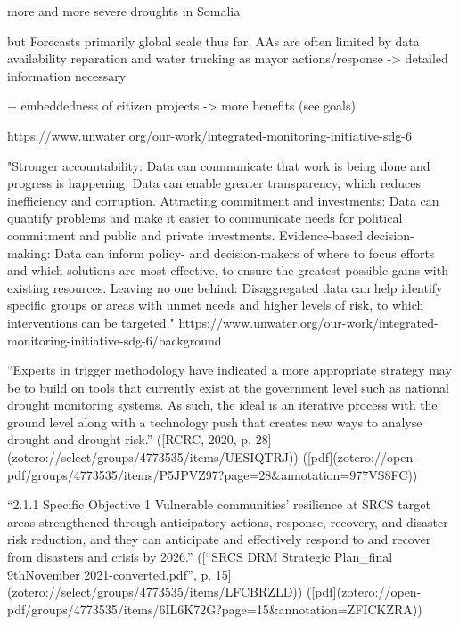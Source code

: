more and more severe droughts in Somalia

but Forecasts primarily global scale
thus far, AAs are often limited by data availability
reparation and water trucking as mayor actions/response -> detailed information necessary

+ embeddedness of citizen projects -> more benefits (see goals)



https://www.unwater.org/our-work/integrated-monitoring-initiative-sdg-6

"Stronger accountability: Data can communicate that work is being done and progress is happening. Data can enable greater transparency, which reduces inefficiency and corruption.
Attracting commitment and investments: Data can quantify problems and make it easier to communicate needs for political commitment and public and private investments.
Evidence-based decision-making: Data can inform policy- and decision-makers of where to focus efforts and which solutions are most effective, to ensure the greatest possible gains with existing resources.
Leaving no one behind: Disaggregated data can help identify specific groups or areas with unmet needs and higher levels of risk, to which interventions can be targeted."
https://www.unwater.org/our-work/integrated-monitoring-initiative-sdg-6/background

“Experts in trigger methodology have indicated a more appropriate strategy may be to build on tools that currently exist at the government level such as national drought monitoring systems. As such, the ideal is an iterative process with the ground level along with a technology push that creates new ways to analyse drought and drought risk.” ([RCRC, 2020, p. 28](zotero://select/groups/4773535/items/UESIQTRJ)) ([pdf](zotero://open-pdf/groups/4773535/items/P5JPVZ97?page=28&annotation=977VS8FC))

“2.1.1 Specific Objective 1 Vulnerable communities’ resilience at SRCS target areas strengthened through anticipatory actions, response, recovery, and disaster risk reduction, and they can anticipate and effectively respond to and recover from disasters and crisis by 2026.” ([“SRCS DRM Strategic Plan_final 9thNovember 2021-converted.pdf”, p. 15](zotero://select/groups/4773535/items/LFCBRZLD)) ([pdf](zotero://open-pdf/groups/4773535/items/6IL6K72G?page=15&annotation=ZFICKZRA))


